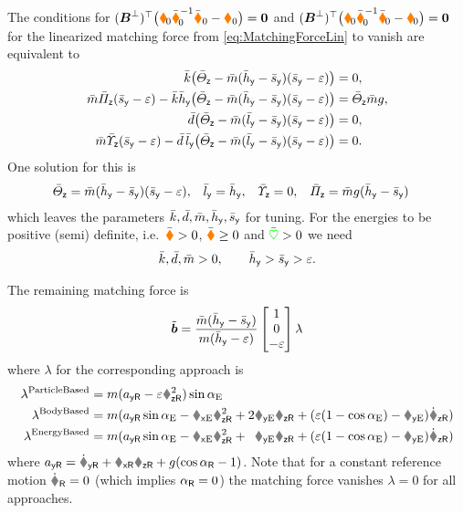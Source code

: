The conditions for $(\sysInputMatLComp)^\top \big( \sysInertiaMatLin \sysInertiaMatCLin^{-1} \sysDissMatCLin - \sysDissMatLin\big) = \mat{0}$ and $(\sysInputMatLComp)^\top \big( \sysInertiaMatLin \sysInertiaMatCLin^{-1} \sysStiffMatCLin - \sysStiffMatLin\big) = \mat{0}$ for the linearized matching force from \eqref{eq:MatchingForceLin} to vanish are equivalent to
\begin{subequations}\label{eq:PVTOLMatchingCondLin}
\begin{align}
 \kc \big( \Jcz - \mc(\hcy - \scy)(\scy - \eps) \big) &= 0,
\\
 \mc \kapcz (\scy-\eps) - \kc\hcy \big( \Jcz - \mc (\hcy - \scy)(\scy - \eps) \big) &= \Jcz \mc \gravityAccConst, 
\\
 \dc \big( \Jcz - \mc(\lcy - \scy)(\scy - \eps) \big) &= 0,
\\
 \mc \sigcz (\scy-\eps) - \dc\,\lcy \big( \Jcz - \mc (\lcy - \scy)(\scy - \eps) \big) &= 0.
\end{align}
\end{subequations}
One solution for this is
\begin{align}\label{eq:PVTOLMatchingSolution}
 \Jcz &= \mc(\hcy - \scy)(\scy - \eps),&
 \lcy &= \hcy,&
 \sigcz &= 0,&
 \kapcz &= \mc \gravityAccConst (\hcy-\scy)
\end{align}
which leaves the parameters $\kc, \dc, \mc, \hcy, \scy$ for tuning.
For the energies to be positive (semi) definite, i.e.\ $\sysInertiaMatC > 0$, $\sysDissMatC \geq 0$ and $\potentialEnergyC > 0$ we need
\begin{align}
 \kc, \dc, \mc > 0, \qquad \hcy > \scy > \eps.
\end{align}

The remaining matching force is
\begin{align}
 \tilde{\sysForce} = \frac{\mc(\hcy-\scy)}{m(\hcy-\eps)} \begin{bmatrix} 1 \\ 0 \\ -\eps \end{bmatrix} \lambda
\end{align}
where $\lambda$ for the corresponding approach is
\begin{subequations}
\begin{align}
 \lambda^{\text{ParticleBased}} &= m(a_{\idxY\idxRef} - \eps\wzR^2)\sin\tiltAngleE
\\
 \lambda^{\text{BodyBased}} &= m(a_{\idxY\idxRef}\sin\tiltAngleE - \rxE\wzR^2 + 2\vyE\wzR + (\eps(1-\cos\tiltAngleE)-\ryE)\wzRd)
\\
 \lambda^{\text{EnergyBased}} &= m(a_{\idxY\idxRef}\sin\tiltAngleE - \rxE\wzR^2 +\phantom{2}\vyE\wzR + (\eps(1-\cos\tiltAngleE)-\ryE)\wzRd)
\end{align} 
\end{subequations}
where $a_{\idxY\idxRef} = \vyRd + \vxR\wzR + \gravityAccConst(\cos\tiltAngleR - 1)$. 
Note that for a constant reference motion $\vRd = 0$ (which implies $\tiltAngleR = 0$) the matching force vanishes $\lambda = 0$ for all approaches.


